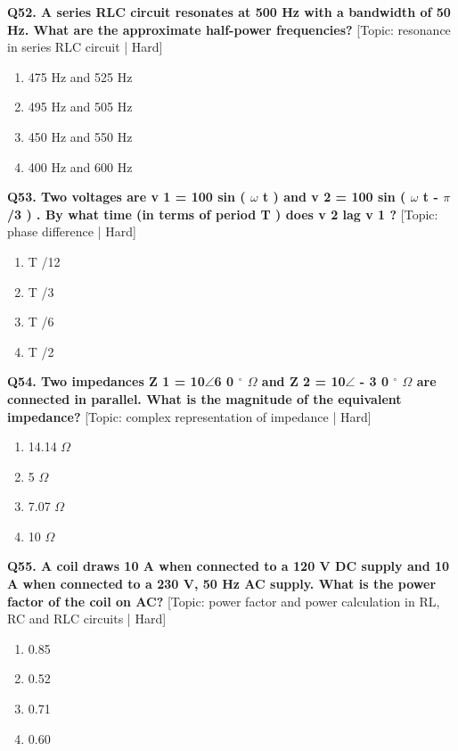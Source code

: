 \noindent\textbf{Q52. A series RLC circuit resonates at 500 Hz with a bandwidth of 50 Hz. What are the approximate half-power frequencies?} \hfill [Topic: resonance in series RLC circuit | Hard]
\begin{enumerate}[label=(\alph*),topsep=2pt,itemsep=1pt,partopsep=0pt,parsep=0pt]
    \item {475 Hz and 525 Hz}
    \item {495 Hz and 505 Hz}
    \item {450 Hz and 550 Hz}
    \item {400 Hz and 600 Hz}
\end{enumerate}
\vspace{2mm}

\noindent\textbf{Q53. Two voltages are v 1 = 100 sin ( $\omega$ t ) and v 2 = 100 sin ( $\omega$ t - $\pi$ /3 ) . By what time (in terms of period T ) does v 2 lag v 1 ?} \hfill [Topic: phase difference | Hard]
\begin{enumerate}[label=(\alph*),topsep=2pt,itemsep=1pt,partopsep=0pt,parsep=0pt]
    \item {T /12}
    \item {T /3}
    \item {T /6}
    \item {T /2}
\end{enumerate}
\vspace{2mm}

\noindent\textbf{Q54. Two impedances Z 1 = 10$\angle$6 0 $^\circ$ $\Omega$ and Z 2 = 10$\angle$ - 3 0 $^\circ$ $\Omega$ are connected in parallel. What is the magnitude of the equivalent impedance?} \hfill [Topic: complex representation of impedance | Hard]
\begin{enumerate}[label=(\alph*),topsep=2pt,itemsep=1pt,partopsep=0pt,parsep=0pt]
    \item {14.14 $\Omega$}
    \item {5 $\Omega$}
    \item {7.07 $\Omega$}
    \item {10 $\Omega$}
\end{enumerate}
\vspace{2mm}

\noindent\textbf{Q55. A coil draws 10 A when connected to a 120 V DC supply and 10 A when connected to a 230 V, 50 Hz AC supply. What is the power factor of the coil on AC?} \hfill [Topic: power factor and power calculation in RL, RC and RLC circuits | Hard]
\begin{enumerate}[label=(\alph*),topsep=2pt,itemsep=1pt,partopsep=0pt,parsep=0pt]
    \item {0.85}
    \item {0.52}
    \item {0.71}
    \item {0.60}
\end{enumerate}
\vspace{2mm}

